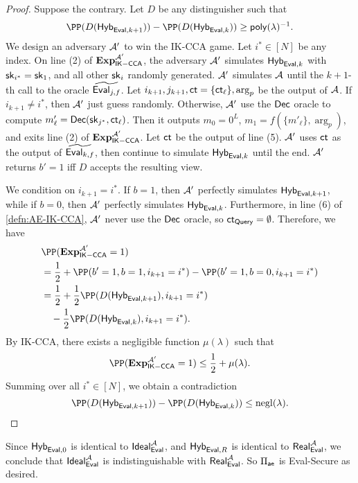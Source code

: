 \begin{proof}
    Suppose the contrary. Let $D$ be any distinguisher such that
    $$\PP(D(\Hyb_{\Eval, k + 1})) - \PP(D(\Hyb_{\Eval, k})) \geq \mathsf{poly}(\lambda)^{-1}.$$
    We design an adversary $\mathcal{A}'$ to win the IK-CCA game. Let $i^* \in [N]$ be any index. On line (2) of $\mathbf{Exp}_{\mathsf{IK-CCA}}^{\mathcal{A}'}$, the adversary $\mathcal{A}'$ simulates $\mathsf{Hyb}_{\mathsf{Eval}, k}$ with ${\mathsf{sk}}_{i^*} = {\mathsf{sk}}_1$, and all other ${\mathsf{sk}}_i$ randomly generated. $\mathcal{A}'$ simulates $\mathcal{A}$ until the $k + 1$-th call to the oracle $\widetilde{\mathsf{Eval}_{j, f}}$. Let $i_{k + 1}, j_{k + 1}, \mathsf{ct} = \{\mathsf{ct}_{\ell}\}, \arg_p$ be the output of $\mathcal{A}$. If $i_{k + 1} \neq i^*$, then $\mathcal{A}'$ just guess randomly. Otherwise, $\mathcal{A}'$ use the $\mathsf{Dec}$ oracle to compute $m'_\ell = \mathsf{Dec}({\mathsf{sk}}_{j^*}, \mathsf{ct}_\ell)$. Then it outputs $m_0 = 0^L$, $m_1 = f(\{m'_\ell\}, \arg_p)$, and exits line (2) of $\mathbf{Exp}_{\mathsf{IK-CCA}}^{\mathcal{A}'}$. Let $\mathsf{ct}$ be the output of line (5). $\mathcal{A}'$ uses $\mathsf{ct}$ as the output of $\widetilde{\mathsf{Eval}_{k, f}}$, then continue to simulate $\mathsf{Hyb}_{\mathsf{Eval}, k}$ until the end. $\mathcal{A}'$ returns $b' = 1$ iff $D$ accepts the resulting view.

    We condition on $i_{k + 1} = i^*$. If $b = 1$, then $\mathcal{A}'$ perfectly simulates $\mathsf{Hyb}_{\mathsf{Eval}, k + 1}$, while if $b = 0$, then $\mathcal{A}'$ perfectly simulates $\mathsf{Hyb}_{\mathsf{Eval}, k}$. Furthermore, in line (6) of \cref{defn:AE-IK-CCA}, $\mathcal{A}'$ never use the $\mathsf{Dec}$ oracle, so $\mathsf{ct}_{\mathsf{Query}} = \emptyset$. Therefore, we have
    \begin{align*}
     &\PP(\mathbf{Exp}_{\mathsf{IK-CCA}}^{\cA'} = 1) \\
     &= \frac{1}{2} + \PP(b' = 1, b = 1, i_{k + 1} = i^*) - \PP(b' = 1, b = 0, i_{k + 1} = i^*) \\   
     &= \frac{1}{2} + \frac{1}{2}\PP(D(\Hyb_{\Eval, k + 1}), i_{k + 1} = i^*)  \\
     & \quad - \frac{1}{2} \PP(D(\Hyb_{\Eval, k}), i_{k + 1} = i^*).
    \end{align*}
    By IK-CCA, there exists a negligible function $\mu(\lambda)$ such that
    $$\PP(\mathbf{Exp}_\mathsf{IK-CCA}^{\cA'} = 1) \leq \frac{1}{2} + \mu(\lambda).$$
    Summing over all $i^* \in [N]$, we obtain a contradiction
    $$\PP(D(\Hyb_{\Eval, k + 1})) - \PP(D(\Hyb_{\Eval, k})) \leq \negl(\lambda).$$
\end{proof}
Since $\mathsf{Hyb}_{\mathsf{Eval}, 0}$ is identical to $\mathsf{Ideal}_{\mathsf{Eval}}^{\mathcal{A}}$, and $\mathsf{Hyb}_{\mathsf{Eval}, R}$ is identical to $\mathsf{Real}_{\mathsf{Eval}}^{\mathcal{A}}$, we conclude that $\mathsf{Ideal}_{\mathsf{Eval}}^{\mathcal{A}}$ is indistinguishable with $\mathsf{Real}_{\mathsf{Eval}}^{\mathcal{A}}$. So $\Pi_{\mathsf{ae}}$ is Eval-Secure as desired.

